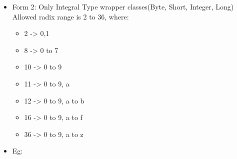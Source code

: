 \begin{flushleft}
\begin{itemize}
\begin{itemize}
\begin{itemize}
				\bigskip
				\item Form 2: Only Integral Type wrapper classes(Byte, Short, Integer, Long)
				\bigskip
				Allowed radix range is 2 to 36, where:
				\begin{itemize}
					\item 2 -> 0,1
					\item 8 -> 0 to 7
					\item 10 -> 0 to 9
					\item 11 -> 0 to 9, a
					\item 12 -> 0 to 9, a to b
					\item 16 -> 0 to 9, a to f
					\item 36 -> 0 to 9, a to z
				\end{itemize}
				\item Eg:
				\bigskip
				
			\end{itemize}
		\end{itemize}



\end{itemize}
\end{flushleft}
